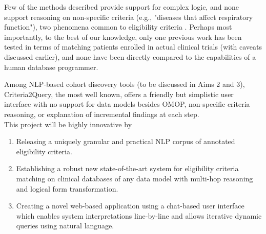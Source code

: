 \documentclass[../main.tex]{subfiles}
\begin{document}
Few of the methods described provide support for complex logic, and none support reasoning on non-specific criteria (e.g., "diseases that affect respiratory function"), two phenomena common to eligibility criteria \cite{wang2017classifying, ross2010analysis}. Perhaps most importantly, to the best of our knowledge, only one previous work has been tested in terms of matching patients enrolled in actual clinical trials \cite{zhang2020deepenroll} (with caveats discussed earlier), and none have been directly compared to the capabilities of a human database programmer. 

Among NLP-based cohort discovery tools (to be discussed in Aims 2 and 3), Criteria2Query, the most well known, offers a friendly but simplistic user interface with no support for data models besides OMOP, non-specific criteria reasoning, or explanation of incremental findings at each step. \\

\noindent This project will be highly innovative by

\begin{enumerate}
    \itemsep0em 
    \item Releasing a uniquely granular and practical NLP corpus of annotated eligibility criteria.
    \item Establishing a robust new state-of-the-art system for eligibility criteria matching on clinical databases of any data model with multi-hop reasoning and logical form transformation.
    \item Creating a novel web-based application using a chat-based user interface which enables system interpretations line-by-line and allows iterative dynamic queries using natural language.
\end{enumerate}
\end{document}
